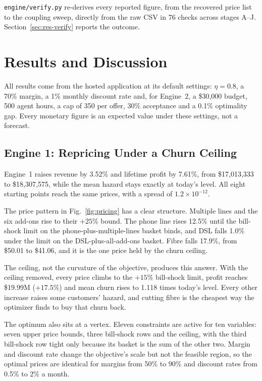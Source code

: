 \documentclass[conference]{IEEEtran}
\begin{document}
\texttt{engine/verify.py} re-derives every reported figure, from the recovered price list to the coupling sweep, directly from the raw CSV in 76 checks across stages A--J. Section~\ref{sec:res-verify} reports the outcome.

\section{Results and Discussion}
\label{sec:results}

All results come from the hosted application at its default settings: $\eta = 0.8$, a 70\% margin, a 1\% monthly discount rate and, for Engine~2, a \$30,000 budget, 500 agent hours, a cap of 350 per offer, 30\% acceptance and a 0.1\% optimality gap. Every monetary figure is an expected value under these settings, not a forecast.

\subsection{Engine 1: Repricing Under a Churn Ceiling}
\label{sec:res-e1}

Engine~1 raises revenue by 3.52\% and lifetime profit by 7.61\%, from \$17,013,333 to \$18,307,575, while the mean hazard stays exactly at today's level. All eight starting points reach the same prices, with a spread of $1.2\times10^{-12}$.

The price pattern in Fig.~\ref{fig:pricing} has a clear structure. Multiple lines and the six add-ons rise to their $+25\%$ bound. The phone line rises 12.5\% until the bill-shock limit on the phone-plus-multiple-lines basket binds, and DSL falls 1.0\% under the limit on the DSL-plus-all-add-ons basket. Fibre falls 17.9\%, from \$50.01 to \$41.06, and it is the one price held by the churn ceiling.

The ceiling, not the curvature of the objective, produces this answer. With the ceiling removed, every price climbs to the $+15\%$ bill-shock limit, profit reaches \$19.99M ($+17.5\%$) and mean churn rises to 1.118 times today's level. Every other increase raises some customers' hazard, and cutting fibre is the cheapest way the optimizer finds to buy that churn back.

The optimum also sits at a vertex. Eleven constraints are active for ten variables: seven upper price bounds, three bill-shock rows and the ceiling, with the third bill-shock row tight only because its basket is the sum of the other two. Margin and discount rate change the objective's scale but not the feasible region, so the optimal prices are identical for margins from 50\% to 90\% and discount rates from 0.5\% to 2\% a month.
\end{document}
